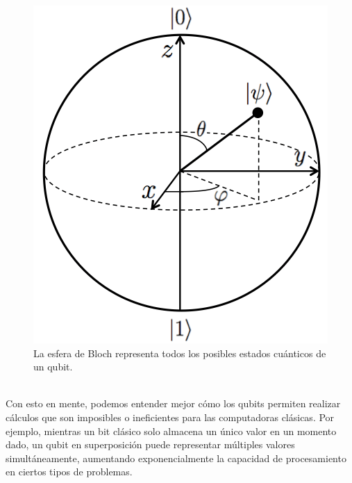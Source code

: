 \begin{figure}[h!]
    \centering
    \includegraphics[scale=0.35]{img/EsferadeBloch.png}
    \caption{La esfera de Bloch representa todos los posibles estados cuánticos de un qubit.}
    \label{fig:esferaBloch}
\end{figure} \\
\noindent
Con esto en mente, podemos entender mejor cómo los qubits permiten realizar cálculos que son imposibles o ineficientes para las computadoras clásicas. Por ejemplo, mientras un bit clásico solo almacena un único valor en un momento dado, un qubit en superposición puede representar múltiples valores simultáneamente, aumentando exponencialmente la capacidad de procesamiento en ciertos tipos de problemas.\\[0.5em] 